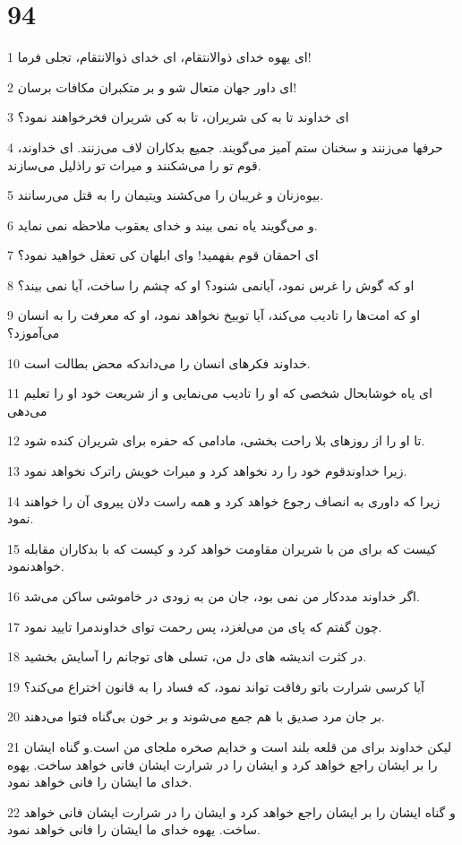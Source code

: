\chapter{94}

\par 1 ای یهوه خدای ذوالانتقام، ای خدای ذوالانتقام، تجلی فرما!
\par 2 ‌ای داور جهان متعال شو و بر متکبران مکافات برسان!
\par 3 ‌ای خداوند تا به کی شریران، تا به کی شریران فخرخواهند نمود؟
\par 4 حرفها می‌زنند و سخنان ستم آمیز می‌گویند. جمیع بدکاران لاف می‌زنند. ای خداوند، قوم تو را می‌شکنند و میراث تو راذلیل می‌سازند.
\par 5 بیوه‌زنان و غریبان را می‌کشند ویتیمان را به قتل می‌رسانند.
\par 6 و می‌گویند یاه نمی بیند و خدای یعقوب ملاحظه نمی نماید.
\par 7 ‌ای احمقان قوم بفهمید! و‌ای ابلهان کی تعقل خواهید نمود؟
\par 8 او که گوش را غرس نمود، آیانمی شنود؟ او که چشم را ساخت، آیا نمی بیند؟
\par 9 او که امت‌ها را تادیب می‌کند، آیا توبیخ نخواهد نمود، او که معرفت را به انسان می‌آموزد؟
\par 10 خداوند فکرهای انسان را می‌داندکه محض بطالت است.
\par 11 ‌ای یاه خوشابحال شخصی که او را تادیب می‌نمایی و از شریعت خود او را تعلیم می‌دهی
\par 12 تا او را از روزهای بلا راحت بخشی، مادامی که حفره برای شریران کنده شود.
\par 13 زیرا خداوندقوم خود را رد نخواهد کرد و میراث خویش راترک نخواهد نمود.
\par 14 زیرا که داوری به انصاف رجوع خواهد کرد و همه راست دلان پیروی آن را خواهند نمود.
\par 15 کیست که برای من با شریران مقاومت خواهد کرد و کیست که با بدکاران مقابله خواهدنمود.
\par 16 اگر خداوند مددکار من نمی بود، جان من به زودی در خاموشی ساکن می‌شد.
\par 17 چون گفتم که پای من می‌لغزد، پس رحمت تو‌ای خداوندمرا تایید نمود.
\par 18 در کثرت اندیشه های دل من، تسلی های توجانم را آسایش بخشید.
\par 19 آیا کرسی شرارت باتو رفاقت تواند نمود، که فساد را به قانون اختراع می‌کند؟
\par 20 بر جان مرد صدیق با هم جمع می‌شوند و بر خون بی‌گناه فتوا می‌دهند.
\par 21 لیکن خداوند برای من قلعه بلند است و خدایم صخره ملجای من است.و گناه ایشان را بر ایشان راجع خواهد کرد و ایشان را در شرارت ایشان فانی خواهد ساخت. یهوه خدای ما ایشان را فانی خواهد نمود.
\par 22 و گناه ایشان را بر ایشان راجع خواهد کرد و ایشان را در شرارت ایشان فانی خواهد ساخت. یهوه خدای ما ایشان را فانی خواهد نمود.
 
